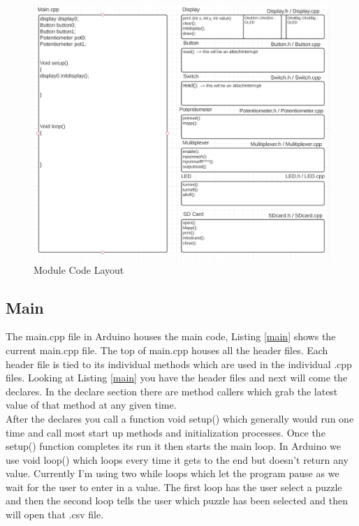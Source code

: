 \documentclass[11pt]{article}
\begin{document}
\begin{figure}
  \includegraphics[width=\linewidth]{./Pics/code_layout.PNG}
  \caption{Module Code Layout}
  \label{fig:MCL1}
\end{figure}

\subsection{Main}
The main.cpp file in Arduino houses the main code, Listing \ref{main} shows the current main.cpp file. The top of main.cpp houses all the header files. Each header file is tied to its individual methods which are used in the individual .cpp files. Looking at Listing \ref{main} you have the header files and next will come the declares. In the declare section there are method callers which grab the latest value of that method at any given time.   
\\

\noindent After the declares you call a function void setup() which generally would run one time and call most start up methods and initialization processes. Once the setup() function completes its run it then starts the main loop. In Arduino we use void loop() which loops every time it gets to the end but doesn't return any value. Currently I'm using two while loops which let the program pause as we wait for the user to enter in a value. The first loop has the user select a puzzle and then the second loop tells the user which puzzle has been selected and then will open that .csv file. 
\end{document}

